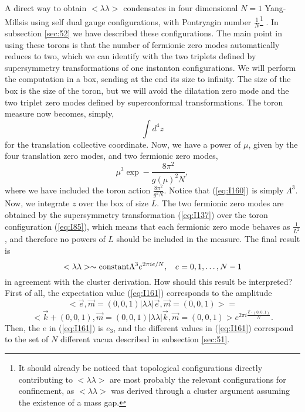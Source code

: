 A direct way to obtain $<\lambda \lambda>$ condensates in four
dimensional $N\!=\!1$ Yang-Millsis using self dual gauge
configurations, with Pontryagin number $\frac {1}{N}$\footnote{It 
should already be noticed that topological configurations directly 
contributing to $<\lambda \lambda>$ are most probably the relevant 
configurations for confinement, as $<\lambda \lambda>$ was 
derived through a cluster argument assuming the existence of a mass 
gap.} \cite{CG}. In subsection \ref{sec:52} we
have described these configurations. The main point in using
these torons is that the number of fermionic zero modes
automatically reduces to two, which we can identify with the two
triplets defined by supersymmetry transformations of one
instanton configurations. We will perform the computation in a
box, sending at the end its size to infinity. The size of the box
is the size of the toron, but we will avoid the dilatation zero
mode and the two triplet zero modes defined by superconformal
transformations. The toron measure now becomes, simply,
\begin{equation}
\int d^4 z
\label{eq:I159}
\end{equation}
for the translation collective coordinate. Now, we have a power
of $\mu$, given by the four translation zero modes, and two
fermionic zero modes,
\begin{equation}
\mu^3 \exp - \frac {8 \pi^2}{g(\mu)^2 N},
\label{eq:I160}
\end{equation}
where we have included the toron action $\frac {8\pi^2}{g^2N}$.
Notice that (\ref{eq:I160}) is simply $\Lambda^3$. Now, we
integrate $z$ over the box of size $L$. The two fermionic zero
modes are obtained by the supersymmetry transformation
(\ref{eq:I137}) over the toron configuration (\ref{eq:I85}),
which means that each fermionic zero mode behaves as $\frac
{1}{L^2}$, and therefore no powers of $L$ should be included in
the measure. The final result is
\begin{equation}
<\lambda \lambda> \sim \hbox {constant} \Lambda^3 e^{2 \pi i
e/N},\: \: \: \: e= 0,1,\ldots,N-1
\label{eq:I161}
\end{equation}
in agreement with the cluster derivation. How should this result
be interpreted? First of all, the expectation value
(\ref{eq:I161}) corresponds to the amplitude
\[
<\vec{e},\vec{m}=(0,0,1) | \lambda \lambda |
\vec{e},\vec{m}=(0,0,1)>=\]
\begin{equation}
<\vec{k}+(0,0,1),\vec{m}=(0,0,1) | \lambda
\lambda | \vec{k},\vec{m}=(0,0,1)> e^{2\pi i \frac {\vec{e} \cdot
(0,0,1)}{N}}.
\label{eq:I162}
\end{equation}
Then, the $e$ in (\ref{eq:I161}) is $e_3$, and the different
values in (\ref{eq:I161}) correspond to the set of $N$ different
vacua described in subsection \ref{sec:51}. 
  
